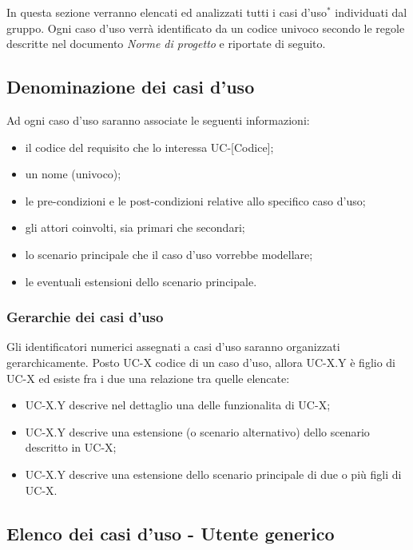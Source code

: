 In questa sezione verranno elencati ed analizzati tutti i casi d'uso$^*$ individuati dal gruppo. Ogni caso d'uso verrà identificato da un codice univoco secondo le regole descritte nel documento \textit{Norme di progetto} e riportate di seguito. 
\subsection{Denominazione dei casi d'uso}
Ad ogni caso d'uso saranno associate le seguenti informazioni:
\begin{itemize}
\item il codice del requisito che lo interessa UC-[Codice];
\item un nome (univoco);
\item le pre-condizioni e le post-condizioni relative allo specifico caso d'uso;
\item gli attori coinvolti, sia primari che secondari;
\item lo scenario principale che il caso d'uso vorrebbe modellare;
\item le eventuali estensioni dello scenario principale.
\end{itemize}

\subsubsection{Gerarchie dei casi d'uso} 

Gli identificatori numerici assegnati a casi d'uso saranno organizzati gerarchicamente. Posto UC-X codice di un caso d'uso, allora UC-X.Y è figlio di UC-X ed esiste fra i due una relazione tra quelle elencate:
\begin{itemize}
\item UC-X.Y descrive nel dettaglio una delle funzionalita di UC-X;
\item UC-X.Y descrive una estensione (o scenario alternativo) dello scenario descritto in UC-X; 
\item UC-X.Y descrive una estensione dello scenario principale di due o più figli di UC-X.
\end{itemize}

\subsection{Elenco dei casi d'uso - Utente generico}
